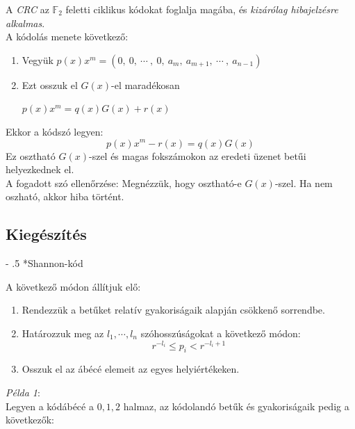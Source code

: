 \documentclass[12pt,margin=0px]{article}
\makeatletter
\renewcommand\paragraph{%
	\@startsection{paragraph}{4}{0mm}%
	{-\baselineskip}%
	{.5\baselineskip}%
	{\normalfont\normalsize\bfseries}}
\makeatother
\begin{document}
    \noindent A \emph{CRC} az $\mathbb{F}_2$ feletti ciklikus kódokat foglalja magába, és \emph{kizárólag hibajelzésre alkalmas}. \\

    \noindent A kódolás menete következő:
    \begin{enumerate}
        \item Vegyük $p(x)x^m = (0,\ 0,\ \cdots\ ,\ 0,\ a_m,\ a_{m+1},\ \cdots\ ,\ a_{n-1})$
        \item Ezt osszuk el $G(x)$-el maradékosan
        \begin{center}
            $p(x)x^m = q(x)G(x)+r(x)$
        \end{center}
    \end{enumerate}
    Ekkor a kódszó legyen:
    \[
        p(x)x^m-r(x) = q(x)G(x)
    \]
    Ez osztható $G(x)$-szel és magas fokszámokon az eredeti üzenet betűi helyezkednek el.\\

    \noindent A fogadott szó ellenőrzése: Megnézzük, hogy osztható-e $G(x)$-szel. Ha nem oszható, akkor hiba történt.\\

\newpage

    \subsection*{Kiegészítés}

    \paragraph*{Shannon-kód}

    A következő módon állítjuk elő:
    \begin{enumerate}
        \item Rendezzük a betűket relatív gyakoriságaik alapján csökkenő sorrendbe.
        \item Határozzuk meg az $l_1,\cdots,l_n$ szóhosszúságokat a következő módon:
        \[r^{-l_i} \leq p_i < r^{-l_i+1} \]
        \item Osszuk el az ábécé elemeit az egyes helyiértékeken.\\
    \end{enumerate}

    \noindent \emph{Példa 1}:\\

    \noindent Legyen a kódábécé a ${0,1,2}$ halmaz, az kódolandó betűk és gyakoriságaik pedig a következők:\\
\end{document}
